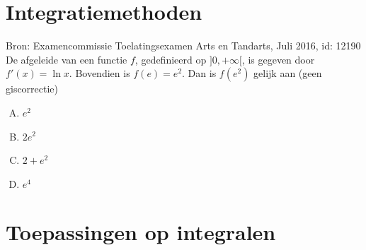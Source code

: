 \documentclass[a4paper,12pt, twoside]{article}
\begin{document}
\cleardoublepage
\section{Integratiemethoden}


\begin{oefening}{\scriptsize Bron: Examencommissie Toelatingsexamen Arts en Tandarts, Juli 2016, id: 12190}\\
De afgeleide van een functie $f$, gedefinieerd op $]0,+\infty[$, is gegeven door $f'(x)=\ln x$. Bovendien is $f(e)=e^2$. Dan is $f(e^2)$ gelijk aan \hfill(geen giscorrectie)
\begin{enumerate}[(A)]
  \itemsep.5em
  \item $e^2$
  \item $2e^2$
  \item $2+e^2$
  \item $e^4$
\end{enumerate}
\end{oefening}

\cleardoublepage
\section{Toepassingen op integralen}
\end{document}
